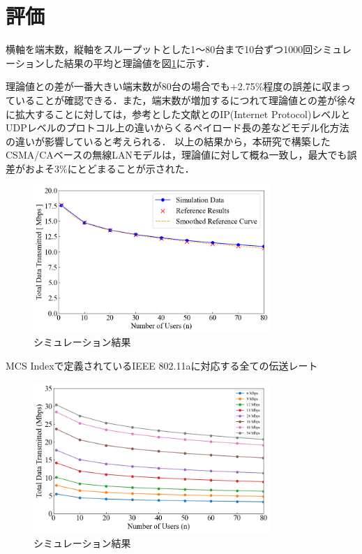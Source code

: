 \documentclass[a4paper,10pt]{ltjsarticle}
\begin{document}
\clearpage
\section{評価}
横軸を端末数，縦軸をスループットとした1～80台まで10台ずつ1000回シミュレーションした結果の平均と理論値を図\ref{fig:simulation-result-a}に示す．



理論値との差が一番大きい端末数が80台の場合でも+2.75\%程度の誤差に収まっていることが確認できる．また，端末数が増加するにつれて理論値との差が徐々に拡大することに対しては，参考とした文献\cite{paper}とのIP(Internet Protocol)レベルとUDPレベルのプロトコル上の違いからくるペイロード長の差などモデル化方法の違いが影響していると考えられる．
以上の結果から，本研究で構築したCSMA/CAベースの無線LANモデルは，理論値に対して概ね一致し，最大でも誤差がおよそ3\%にとどまることが示された．

\begin{figure}[H]
  \centering
  \includegraphics[width=0.8\textwidth]{./assets/g3.png}
  \caption{シミュレーション結果}
  \label{fig:simulation-result-a}
\end{figure}

MCS Indexで定義されているIEEE 802.11aに対応する全ての伝送レート


\begin{figure}[H]
  \centering
  \includegraphics[width=0.8\textwidth]{./assets/mcs_index.png}
  \caption{シミュレーション結果}
  \label{fig:simulation-result-mcs-index}
\end{figure}
\end{document}
